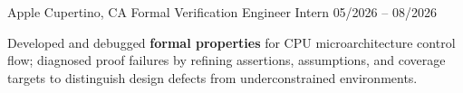 \vspace{0.8mm}


\begin{cventries}

\cventry
{Apple}
{Cupertino, CA}
{Formal Verification Engineer Intern}
{05/2026 -- 08/2026}
{
  \vspace{-3.5mm}
  \begin{cvitems}
    \item {Developed and debugged \textbf{formal properties} for CPU microarchitecture control flow; diagnosed proof failures by refining assertions, assumptions, and coverage targets to distinguish design defects from underconstrained environments.}
  \end{cvitems}
}

\end{cventries}
